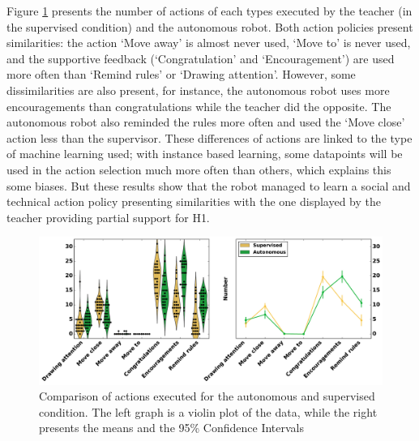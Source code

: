 Figure \ref{fig:tutoring_actions} presents the number of actions of each types executed by the teacher (in the supervised condition) and the autonomous robot. Both action policies present similarities: the action `Move away' is almost never used, `Move to' is never used, and the supportive feedback (`Congratulation' and `Encouragement') are used more often than `Remind rules' or `Drawing attention'. However, some dissimilarities are also present, for instance, the autonomous robot uses more encouragements than congratulations while the teacher did the opposite. The autonomous robot also reminded the rules more often and used the `Move close' action less than the supervisor. These differences of actions are linked to the type of machine learning used; with instance based learning, some datapoints will be used in the action selection much more often than others, which explains this some biases. But these results show that the robot managed to learn a social and technical action policy presenting similarities with the one displayed by the teacher providing partial support for H1.

\begin{figure}[ht]
	\includegraphics[width=1\linewidth]{actions.pdf}
	\centering
	\caption{Comparison of actions executed for the autonomous and supervised condition. The left graph is a violin plot of the data, while the right presents the means and the 95\% Confidence Intervals}
	\label{fig:tutoring_actions}
\end{figure}


